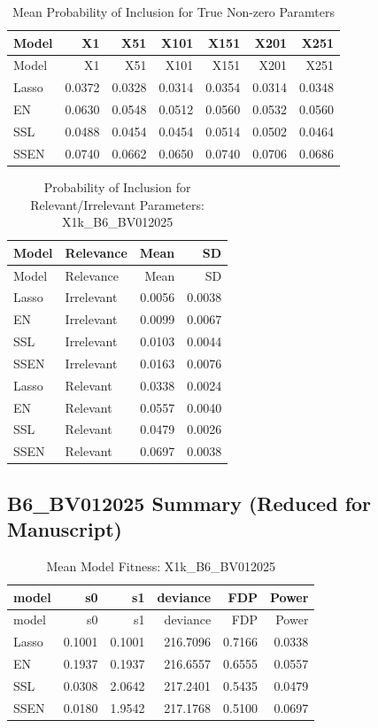 \documentclass[
]{article}
\begin{document}
\begin{longtable}[]{@{}lrrrrrr@{}}
\caption{Mean Probability of Inclusion for True Non-zero
Paramters}\tabularnewline
\toprule
Model & X1 & X51 & X101 & X151 & X201 & X251 \\
\midrule
\endfirsthead
\toprule
Model & X1 & X51 & X101 & X151 & X201 & X251 \\
\midrule
\endhead
Lasso & 0.0372 & 0.0328 & 0.0314 & 0.0354 & 0.0314 & 0.0348 \\
EN & 0.0630 & 0.0548 & 0.0512 & 0.0560 & 0.0532 & 0.0560 \\
SSL & 0.0488 & 0.0454 & 0.0454 & 0.0514 & 0.0502 & 0.0464 \\
SSEN & 0.0740 & 0.0662 & 0.0650 & 0.0740 & 0.0706 & 0.0686 \\
\bottomrule
\end{longtable}

\begin{longtable}[]{@{}llrr@{}}
\caption{Probability of Inclusion for Relevant/Irrelevant Parameters:
X1k\_B6\_BV012025}\tabularnewline
\toprule
Model & Relevance & Mean & SD \\
\midrule
\endfirsthead
\toprule
Model & Relevance & Mean & SD \\
\midrule
\endhead
Lasso & Irrelevant & 0.0056 & 0.0038 \\
EN & Irrelevant & 0.0099 & 0.0067 \\
SSL & Irrelevant & 0.0103 & 0.0044 \\
SSEN & Irrelevant & 0.0163 & 0.0076 \\
Lasso & Relevant & 0.0338 & 0.0024 \\
EN & Relevant & 0.0557 & 0.0040 \\
SSL & Relevant & 0.0479 & 0.0026 \\
SSEN & Relevant & 0.0697 & 0.0038 \\
\bottomrule
\end{longtable}

\hypertarget{b6_bv012025-summary-reduced-for-manuscript}{%
\subsection{B6\_BV012025 Summary (Reduced for
Manuscript)}\label{b6_bv012025-summary-reduced-for-manuscript}}

\begin{longtable}[]{@{}lrrrrr@{}}
\caption{Mean Model Fitness: X1k\_B6\_BV012025}\tabularnewline
\toprule
model & s0 & s1 & deviance & FDP & Power \\
\midrule
\endfirsthead
\toprule
model & s0 & s1 & deviance & FDP & Power \\
\midrule
\endhead
Lasso & 0.1001 & 0.1001 & 216.7096 & 0.7166 & 0.0338 \\
EN & 0.1937 & 0.1937 & 216.6557 & 0.6555 & 0.0557 \\
SSL & 0.0308 & 2.0642 & 217.2401 & 0.5435 & 0.0479 \\
SSEN & 0.0180 & 1.9542 & 217.1768 & 0.5100 & 0.0697 \\
\bottomrule
\end{longtable}
\end{document}
